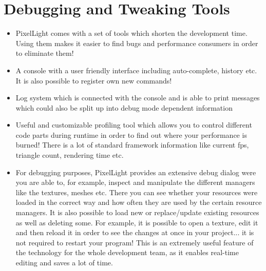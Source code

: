 \section{Debugging and Tweaking Tools}
\begin{itemize}
\item{PixelLight comes with a set of tools which shorten the development time. Using them makes it easier to find bugs and performance consumers in order to eliminate them!}
\item{A console with a user friendly interface including auto-complete, history etc. It is also possible to register own new commands!}
\item{Log system which is connected with the console and is able to print messages which could also be split up into debug mode dependent information}
\item{Useful and customizable profiling tool which allows you to control different code parts during runtime in order to find out where your performance is burned! There is a lot of standard framework information like current fps, triangle count, rendering time etc.}
\item{For debugging purposes, PixelLight provides an extensive debug dialog were you are able to, for example, inspect and manipulate the different managers like the textures, meshes etc. There you can see whether your resources were loaded in the correct way and how often they are used by the certain resource managers. It is also possible to load new or replace/update existing resources as well as deleting some. For example, it is possible to open a texture, edit it and then reload it in order to see the changes at once in your project... it is not required to restart your program! This is an extremely useful feature of the technology for the whole development team, as it enables real-time editing and saves a lot of time.}
\end{itemize}
\newpage
